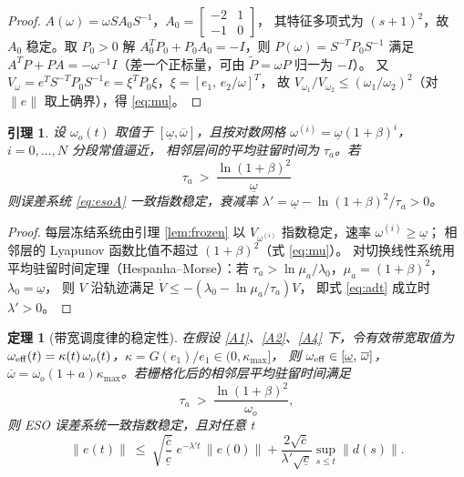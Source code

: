 \documentclass[UTF8,fontset=windows,a4paper,11pt]{ctexart}
\newtheorem{theorem}{定理}
\newtheorem{lemma}{引理}
\begin{document}
\begin{proof}
$A(\omega)=\omega S A_0S^{-1}$，$A_0=\begin{bmatrix}-2&1\\-1&0\end{bmatrix}$，
其特征多项式为 $(s+1)^2$，故 $A_0$ 稳定。取 $P_0>0$ 解
$A_0^{T}P_0+P_0A_0=-I$，则 $P(\omega)=S^{-T}P_0S^{-1}$ 满足
$A^{T}P+PA=-\omega^{-1}I$（差一个正标量，可由 $\tilde P=\omega P$ 归一为 $-I$）。
又 $V_\omega=e^{T}S^{-T}P_0S^{-1}e=\xi^{T}P_0\xi$，$\xi=[e_1,\,e_2/\omega]^{T}$，
故 $V_{\omega_1}/V_{\omega_2}\le(\omega_1/\omega_2)^{2}$（对 $\|e\|$ 取上确界），得 \eqref{eq:mu}。
\end{proof}

\begin{lemma}\label{lem:sched}
设 $\omega_o(t)$ 取值于 $[\underline{\omega},\overline{\omega}]$，且按对数网格
$\omega^{(i)}=\underline{\omega}(1+\beta)^{i}$，$i=0,\dots,N$ 分段常值逼近，
相邻层间的平均驻留时间为 $\tau_a$。若
\begin{equation}
\tau_a\ >\ \frac{\ln(1+\beta)^{2}}{\underline{\omega}}
\label{eq:adt}
\end{equation}
则误差系统 \eqref{eq:esoA} 一致指数稳定，衰减率
$\lambda'=\underline{\omega}-\ln(1+\beta)^{2}/\tau_a>0$。
\end{lemma}

\begin{proof}
每层冻结系统由引理 \ref{lem:frozen} 以 $V_{\omega^{(i)}}$ 指数稳定，速率 $\omega^{(i)}\ge\underline{\omega}$；
相邻层的 Lyapunov 函数比值不超过 $(1+\beta)^{2}$（式 \eqref{eq:mu}）。
对切换线性系统用平均驻留时间定理（Hespanha--Morse）：若
$\tau_a>\ln\mu_a/\lambda_0$，$\mu_a=(1+\beta)^{2}$，$\lambda_0=\underline{\omega}$，
则 $V$ 沿轨迹满足 $\dot V\le-(\lambda_0-\ln\mu_a/\tau_a)V$，
即式 \eqref{eq:adt} 成立时 $\lambda'>0$。
\end{proof}

\begin{theorem}[带宽调度律的稳定性]\label{thm:gain}
在假设 \ref{A1}、\ref{A2}、\ref{A4} 下，令有效带宽取值为
$\omega_{\rm eff}(t)=\kappa(t)\,\omega_o(t)$，$\kappa=G(e_1)/e_1\in(0,\kappa_{\max}]$，
则 $\omega_{\rm eff}\in[\underline{\omega},\,\overline{\omega}]$，
$\overline{\omega}=\omega_o(1+a)\kappa_{\max}$。若栅格化后的相邻层平均驻留时间满足
\begin{equation}
\tau_a\ >\ \frac{\ln(1+\beta)^{2}}{\omega_o},
\label{eq:adt2}
\end{equation}
则 ESO 误差系统一致指数稳定，且对任意 $t$
\begin{equation}
\|e(t)\|\ \le\ \sqrt{\frac{\overline{c}}{\underline{c}}}\;
e^{-\lambda' t}\,\|e(0)\|+\frac{2\sqrt{\overline{c}}}{\lambda'\sqrt{\underline{c}}}\sup_{s\le t}\|d(s)\| .
\label{eq:thm2}
\end{equation}
\end{theorem}
\end{document}
